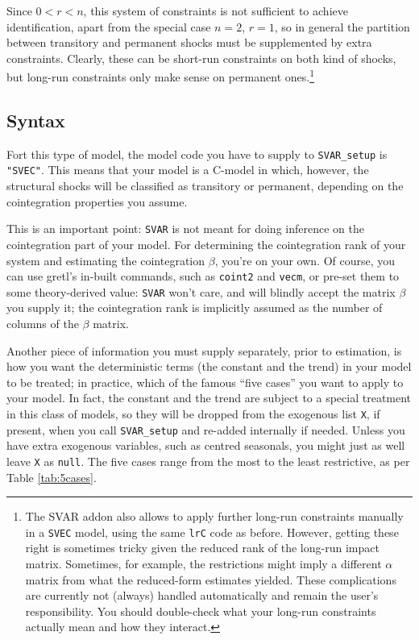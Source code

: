 \documentclass[a4paper,10pt]{article}
\newcommand{\app}[1]{\textsf{#1}}
\newcommand{\cmd}[1]{\texttt{#1}}
\begin{document}
Since $0 < r < n$, this system of constraints is not sufficient to
achieve identification, apart from the special case $n =2$, $r=1$, so
in general the partition between transitory and permanent shocks must
be supplemented by extra constraints. Clearly, these can be short-run
constraints on both kind of shocks, but long-run constraints only make
sense on permanent ones.\footnote{The SVAR addon also allows to apply 
further long-run constraints manually in a \texttt{SVEC} model, using the
same \texttt{lrC} code as before. However, getting these right is sometimes
tricky given the reduced rank of the long-run impact matrix. Sometimes, for
example, the restrictions might imply a different $\alpha$ matrix from what 
the reduced-form estimates yielded. These complications are currently not 
(always) handled automatically and remain the user's responsibility. You 
should double-check what your long-run constraints actually mean and how 
they interact.}


\subsection{Syntax}
\label{sec:KPSWsyntax}

Fort this type of model, the model code you have to supply to
\cmd{SVAR\_setup} is \cmd{"SVEC"}. This means that your model is a
C-model in which, however, the structural shocks will be classified as
transitory or permanent, depending on the cointegration properties you
assume.

This is an important point: \texttt{SVAR} is not meant for doing
inference on the cointegration part of your model. For determining the
cointegration rank of your system and estimating the cointegration
$\beta$, you're on your own. Of course, you can use \app{gretl}'s
in-built commands, such as \cmd{coint2} and \cmd{vecm}, or pre-set
them to some theory-derived value: \texttt{SVAR} won't care, and will
blindly accept the matrix $\beta$ you supply it; the cointegration
rank is implicitly assumed as the number of columns of the $\beta$
matrix.

Another piece of information you must supply separately, prior to
estimation, is how you want the deterministic terms (the constant and
the trend) in your model to be treated; in practice, which of the
famous ``five cases'' you want to apply to your model. In fact, the
constant and the trend are subject to a special treatment in this
class of models, so they will be dropped from the exogenous list
\texttt{X}, if present, when you call \cmd{SVAR\_setup} and re-added
internally if needed. Unless you have extra exogenous variables, such
as centred seasonals, you might just as well leave \texttt{X} as
\texttt{null}. The five cases range from the most to the least
restrictive, as per Table \ref{tab:5cases}.
\end{document}
